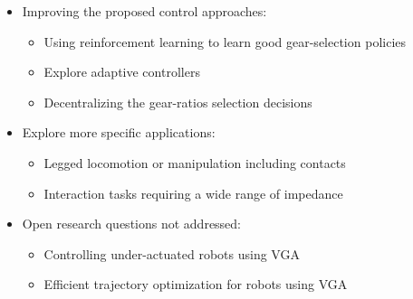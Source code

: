 \begin{itemize}
		\item Improving the proposed control approaches:
		\begin{itemize}
			\item Using reinforcement learning to learn good gear-selection policies
			\item Explore adaptive controllers
			\item Decentralizing the gear-ratios selection decisions
		\end{itemize}
		\item Explore more specific applications:
		\begin{itemize}
			\item Legged locomotion or manipulation including contacts
			\item Interaction tasks requiring a wide range of impedance
		\end{itemize}
		\item Open research questions not addressed:
		\begin{itemize}
			\item Controlling under-actuated robots using VGA
			\item Efficient trajectory optimization for robots using VGA
		\end{itemize}
\end{itemize}